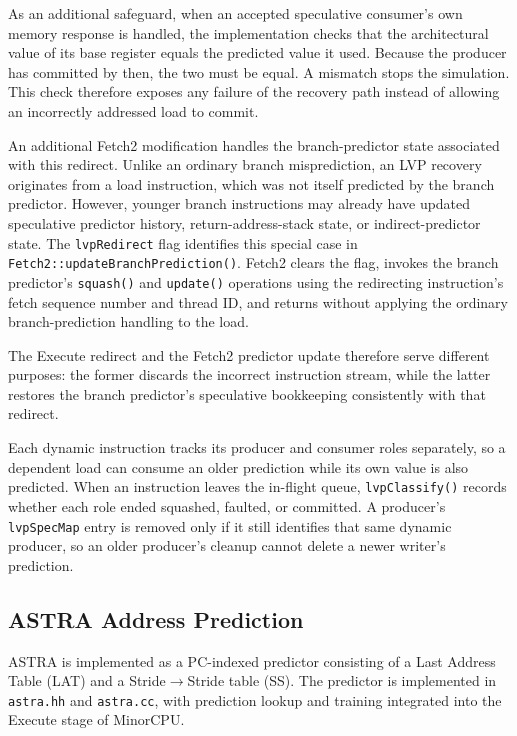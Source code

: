As an additional safeguard, when an accepted speculative consumer's
own memory response is handled, the implementation checks that the
architectural value of its base register equals the predicted value
it used. Because the producer has committed by then, the two must be
equal. A mismatch stops the simulation. This check therefore exposes
any failure of the recovery path instead of allowing an incorrectly
addressed load to commit.

An additional Fetch2 modification handles the branch-predictor
state associated with this redirect. Unlike an ordinary branch
misprediction, an LVP recovery originates from a load instruction,
which was not itself predicted by the branch predictor. However,
younger branch instructions may already have updated speculative
predictor history, return-address-stack state, or indirect-predictor
state. The \texttt{lvpRedirect} flag identifies this special case
in \texttt{Fetch2::\allowbreak updateBranch\allowbreak Prediction()}. Fetch2 clears the
flag, invokes the branch predictor's \texttt{squash()} and
\texttt{update()} operations using the redirecting instruction's
fetch sequence number and thread ID, and returns without applying
the ordinary branch-prediction handling to the load.

The Execute redirect and the Fetch2 predictor update therefore
serve different purposes: the former discards the incorrect
instruction stream, while the latter restores the branch predictor's
speculative bookkeeping consistently with that redirect.

Each dynamic instruction tracks its producer and consumer roles
separately, so a dependent load can consume an older prediction while
its own value is also predicted. When an instruction leaves the
in-flight queue, \texttt{lvpClassify()} records whether each role
ended squashed, faulted, or committed. A producer's
\texttt{lvpSpecMap} entry is removed only if it still identifies that
same dynamic producer, so an older producer's cleanup cannot delete a
newer writer's prediction.

\subsection{ASTRA Address Prediction}
\label{sec:impl-astra}

ASTRA is implemented as a PC-indexed predictor consisting of a
Last Address Table (LAT) and a Stride$\rightarrow$Stride table (SS). The
predictor is implemented in \texttt{astra.hh} and \texttt{astra.cc},
with prediction lookup and training integrated into the Execute stage
of MinorCPU.


